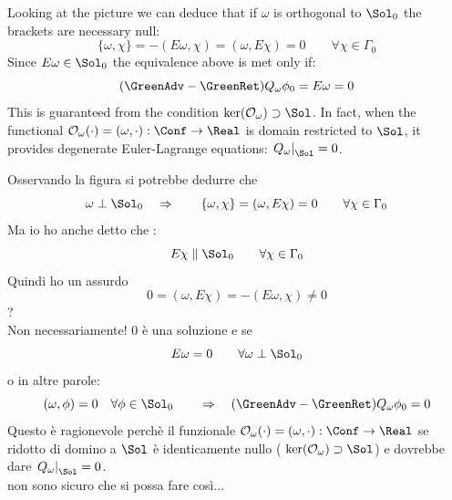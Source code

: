 \documentclass[Main]{subfiles}
\begin{document}
		\vspace{2mm}
		Looking at the picture we can deduce that if $\omega$ is orthogonal to $\Sol_0$ the brackets are necessary null:
			\begin{displaymath}
				 \{\omega, \chi\} = -(E \omega , \chi) = ( \omega , E \chi)=0 \qquad \forall \chi \in \Gamma_0
			\end{displaymath}
		Since $E\omega \in \Sol_0$ the equivalence above is met only if:
		\begin{displaymath}
		(\GreenAdv - \GreenRet) Q_\omega \phi_0= E \omega = 0 
		\end{displaymath}
		This is guaranteed from the condition $\ker(\mathcal{O}_\omega) \supset \Sol$.
		In fact, when the functional $\mathcal{O}_\omega (\cdot) = ( \omega, \cdot): \Conf \rightarrow \Real$ is domain restricted to $\Sol$, it provides degenerate Euler-Lagrange equations: $\left. Q_\omega \right\vert_\Sol = 0$.

\ifToninus
		\begin{Warning}
			Osservando la figura si potrebbe dedurre che 
			\begin{displaymath}
				\omega \perp \Sol_0 \quad \Rightarrow \qquad \{\omega, \chi\} = ( \omega , E \chi)=0 \qquad \forall \chi \in \Gamma_0
			\end{displaymath}
			Ma io ho anche detto che :
			\begin{displaymath}
				E \chi \parallel \Sol_0 \qquad \forall \chi \in \Gamma_0
			\end{displaymath}
			Quindi ho un assurdo
			\begin{displaymath}
				 0 = ( \omega , E \chi)=-( E\omega ,  \chi)\neq 0
			\end{displaymath}
			?\\
			Non necessariamente! 0 è una soluzione e se 
			\begin{displaymath}
				E\omega= 0   \qquad \forall \omega \perp \Sol_0
			\end{displaymath}
			o in altre parole: 
			\begin{displaymath}
				(\omega, \phi) = 0 \quad \forall \phi \in \Sol_0  \qquad \Rightarrow  \quad(\GreenAdv - \GreenRet) Q_\omega \phi_0= 0 
			\end{displaymath}
			Questo è ragionevole perchè il funzionale $\mathcal{O}_\omega (\cdot) = ( \omega, \cdot): \Conf \rightarrow \Real$ se ridotto di domino a $\Sol$ è identicamente nullo ( $\ker(\mathcal{O}_\omega) \supset \Sol$) e  dovrebbe dare $\left. Q_\omega \right\vert_\Sol = 0$.
			\\ non sono sicuro che si possa fare così... 
		\end{Warning}
\fi	
	
\end{document}
